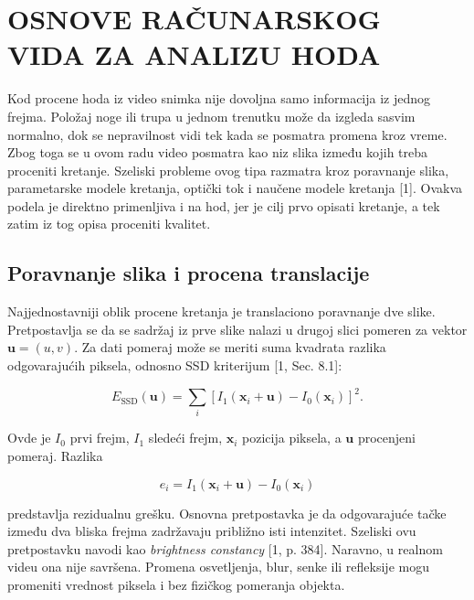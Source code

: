 %
%

\chapter{OSNOVE RAČUNARSKOG VIDA ZA ANALIZU HODA}

Kod procene hoda iz video snimka nije dovoljna samo informacija iz jednog frejma. Položaj noge ili trupa u jednom trenutku može da izgleda sasvim normalno, dok se nepravilnost vidi tek kada se posmatra promena kroz vreme. Zbog toga se u ovom radu video posmatra kao niz slika između kojih treba proceniti kretanje. Szeliski probleme ovog tipa razmatra kroz poravnanje slika, parametarske modele kretanja, optički tok i naučene modele kretanja [1]. Ovakva podela je direktno primenljiva i na hod, jer je cilj prvo opisati kretanje, a tek zatim iz tog opisa proceniti kvalitet.

\section{Poravnanje slika i procena translacije}

Najjednostavniji oblik procene kretanja je translaciono poravnanje dve slike. Pretpostavlja se da se sadržaj iz prve slike nalazi u drugoj slici pomeren za vektor $\mathbf{u}=(u,v)$. Za dati pomeraj može se meriti suma kvadrata razlika odgovarajućih piksela, odnosno SSD kriterijum [1, Sec. 8.1]:

\begin{equation}
E_{\mathrm{SSD}}(\mathbf{u})=
\sum_i \left[I_1(\mathbf{x}_i+\mathbf{u})-I_0(\mathbf{x}_i)\right]^2.
\label{eq:ssd_alignment}
\end{equation}

Ovde je $I_0$ prvi frejm, $I_1$ sledeći frejm, $\mathbf{x}_i$ pozicija piksela, a $\mathbf{u}$ procenjeni pomeraj. Razlika

\begin{equation}
e_i=I_1(\mathbf{x}_i+\mathbf{u})-I_0(\mathbf{x}_i)
\end{equation}

predstavlja rezidualnu grešku. Osnovna pretpostavka je da odgovarajuće tačke između dva bliska frejma zadržavaju približno isti intenzitet. Szeliski ovu pretpostavku navodi kao \textit{brightness constancy} [1, p. 384]. Naravno, u realnom videu ona nije savršena. Promena osvetljenja, blur, senke ili refleksije mogu promeniti vrednost piksela i bez fizičkog pomeranja objekta.

